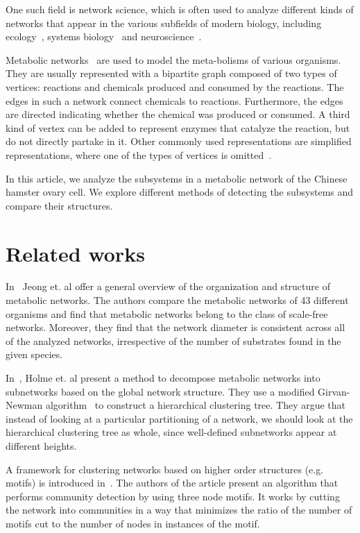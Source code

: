 One such field is network science, which
is often used to analyze different kinds of networks that appear in the various
subfields of modern biology, including ecology~\cite{proulx2005network}, systems
biology~\cite{barabasi2004network} and neuroscience~\cite{sporns2014contributions}.

Metabolic networks~\cite{jeong2000large} are used to model the meta-bolisms of
various organisms. They are usually represented with a bipartite graph composed
of two types of vertices: reactions and chemicals produced and consumed by the
reactions. The edges in such a network connect chemicals to
reactions. Furthermore, the edges are directed indicating whether the chemical
was produced or consumed. A third kind of vertex can be added to represent
enzymes that catalyze the reaction, but do not directly partake in
it. Other commonly used representations are simplified representations, where
one of the types of vertices is omitted~\cite{newman2010networks}.

In this article, we analyze the subsystems in a metabolic network of the
Chinese hamster ovary cell. We explore different methods of detecting the
subsystems and compare their structures.

\section{Related works}
\label{sec:related}

In~\cite{jeong2000large} Jeong et. al offer a general overview of the
organization and structure of metabolic networks. The authors compare the
metabolic networks of 43 different organisms and find that metabolic networks
belong to the class of scale-free networks. Moreover, they find that the network
diameter is consistent across all of the analyzed networks, irrespective of the
number of substrates found in the given species.

In~\cite{holme2003subnetwork}, Holme et. al present a method to decompose
metabolic networks into subnetworks based on the global network structure. They
use a modified Girvan-Newman algorithm~\cite{girvan2002community} to construct a
hierarchical clustering tree. They argue that instead of looking at a particular
partitioning of a network, we should look at the hierarchical clustering tree as
whole, since well-defined subnetworks appear at different heights.

A framework for clustering networks based on higher order structures
(e.g. motifs) is introduced in~\cite{benson2016higher}. The authors of the
article present an algorithm that performs community detection by using three
node motifs. It works by cutting the network into communities in a way that
minimizes the ratio of the number of motifs cut to the number of nodes in
instances of the motif.

